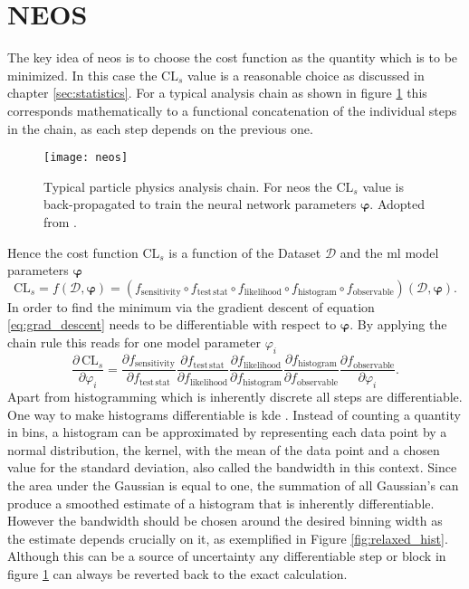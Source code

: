 \section{NEOS}
The key idea of \acl{neos} is to choose the cost function as the quantity which is to be minimized. In this case the $\mathrm{CL}_s$ value is a reasonable choice as discussed in chapter \ref{sec:statistics}. For a typical analysis chain as shown in figure \ref{fig:neos} this corresponds mathematically to a functional concatenation of the individual steps in the chain, as each step depends on the previous one.
\begin{figure}
    \centering
    \texttt{[image: neos]}
    \caption[]{Typical particle physics analysis chain. For \ac{neos} the $\text{CL}_s$ value is back-propagated to train the neural network parameters  $\bm{\varphi}$. Adopted from \citep{Simpson_2023}.}
    \label{fig:neos}
\end{figure}
Hence the cost function $\text{CL}_s$ is a function of the Dataset $\mathcal{D}$ and the \ac{ml} model parameters $\bm{\varphi}$
\begin{equation}
    \mathrm{CL}_s = f(\mathcal{D},\bm{\varphi}) = (f_{\mathrm{sensitivity}} \circ f_{\mathrm{test\,stat}} \circ f_{\mathrm{likelihood}}  \circ f_{\mathrm{histogram}}  \circ f_{\mathrm{observable}})(\mathcal{D},\bm{\varphi}).
\end{equation}
In order to find the minimum via the gradient descent of equation \ref{eq:grad_descent} \cls needs to be differentiable with respect to $\bm{\varphi}$. By applying the chain rule this reads for one model parameter $\varphi_i$
\begin{equation}
    \frac{\partial\,\mathrm{CL}_s}{\partial \varphi_i} = \frac{\partial f_{\mathrm{sensitivity}}}{\partial f_{\mathrm{test\,stat}}}\frac{\partial f_{\mathrm{test\,stat}}}{\partial f_{ \mathrm{likelihood}}} \frac{\partial f_{\mathrm{likelihood}}}{\partial f_{\mathrm{histogram}}}   \frac{\partial f_{\mathrm{histogram}}}{\partial f_{\mathrm{observable}}}  \frac{\partial f_{\mathrm{observable}}}{\partial \varphi_i}.
\end{equation}
Apart from histogramming which is inherently discrete all steps are differentiable. One way to make histograms differentiable is \ac{kde} \citep{CRANMER2001198}. Instead of counting a quantity in bins, a histogram can be approximated by representing each data point by a normal distribution, the kernel, with the mean of the data point and a chosen value for the standard deviation, also called the bandwidth in this context. Since the area under the Gaussian is equal to one, the summation of all Gaussian's can produce a smoothed estimate of a histogram that is inherently differentiable. However the bandwidth should be chosen around the desired binning width as the estimate depends crucially on it, as exemplified in Figure \ref{fig:relaxed_hist}. Although this can be a source of uncertainty any differentiable step or block in figure \ref{fig:neos} can always be reverted back to the exact calculation.
